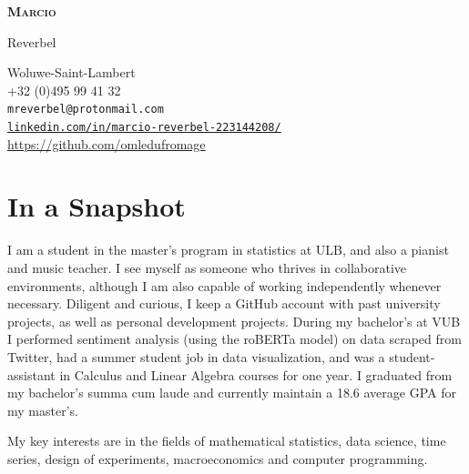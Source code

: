 \documentclass[12pt]{article}
\newcommand{\mycolor}{mySlateBlue}
\newcommand{\thesectionicon}{}
\newcommand{\sectionicon}[1]{\renewcommand{\thesectionicon}{#1}}
\begin{document}
\begin{minipage}[t]{0.25\textwidth}
  {\sffamily\bfseries\scshape\huge
    Marcio
    
         \vspace{1ex}
     
    Reverbel}
\end{minipage}
\hfill
\begin{minipage}[t]{0.65\textwidth}
  \begin{small}
  \begin{flushright}
  Woluwe-Saint-Lambert\ \ \textcolor{\mycolor}{\faHome\\}
  +32 (0)495 99 41 32\ \ \textcolor{\mycolor}{\faPhone\\}
  \texttt{mreverbel@protonmail.com}\ \ \textcolor{\mycolor}{\faEnvelope\\}
  \href{https://linkedin.com/in/marcio-reverbel-223144208/}{\texttt{linkedin.com/in/marcio-reverbel-223144208/}}\ \ \textcolor{\mycolor}{\faLinkedin\\}
  \url{https://github.com/omledufromage}\ \ \textcolor{\mycolor}{\faGithub\\}
  \end{flushright}
  \end{small}
\end{minipage}

\sectionicon{\faUser}
\section{In a Snapshot}

I am a student in the master's program in statistics at ULB, and also a pianist and music teacher. I see myself as someone who thrives in collaborative environments, although I am also capable of working independently whenever necessary. Diligent and curious, I keep a GitHub account with past university projects, as well as personal development projects. During my bachelor's at VUB I performed sentiment analysis (using the roBERTa model) on data scraped from Twitter, had a summer student job in data visualization, and was a student-assistant in Calculus and Linear Algebra courses for one year. I graduated from my bachelor's summa cum laude and currently maintain a 18.6 average GPA for my master's. 

\vspace{1.5ex}
My key interests are in the fields of mathematical statistics, data science, time series, design of experiments, macroeconomics and computer programming.
\end{document}
